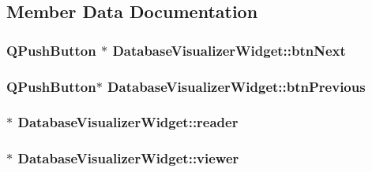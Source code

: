\subsection{Member Data Documentation}
\hypertarget{class_database_visualizer_widget_ab1fc33de442247d3e112b84cde259b24}{
\subsubsection[{btn\+Next}]{\setlength{\rightskip}{0pt plus 5cm}Q\+Push\+Button $\ast$ Database\+Visualizer\+Widget\+::btn\+Next\hspace{0.3cm}{\ttfamily [private]}}}\label{class_database_visualizer_widget_ab1fc33de442247d3e112b84cde259b24}
\hypertarget{class_database_visualizer_widget_a01dafc7769283b01d50b4e539b3ea5a6}{
\subsubsection[{btn\+Previous}]{\setlength{\rightskip}{0pt plus 5cm}Q\+Push\+Button$\ast$ Database\+Visualizer\+Widget\+::btn\+Previous\hspace{0.3cm}{\ttfamily [private]}}}\label{class_database_visualizer_widget_a01dafc7769283b01d50b4e539b3ea5a6}
\hypertarget{class_database_visualizer_widget_a37786e95a3407c3df7b4f2e94324b9e7}{
\subsubsection[{reader}]{$\ast$ Database\+Visualizer\+Widget\+::reader\hspace{0.3cm}{\ttfamily [private]}}}\label{class_database_visualizer_widget_a37786e95a3407c3df7b4f2e94324b9e7}
\hypertarget{class_database_visualizer_widget_a943fdaf6c76b8a3a36bd16e048f69711}{
\subsubsection[{viewer}]{$\ast$ Database\+Visualizer\+Widget\+::viewer\hspace{0.3cm}{\ttfamily [private]}}}\label{class_database_visualizer_widget_a943fdaf6c76b8a3a36bd16e048f69711}


